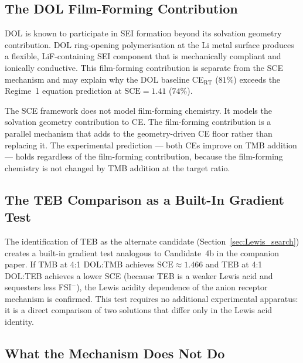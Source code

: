 \documentclass[11pt]{article}
\theoremstyle{plain}
\theoremstyle{definition}
\theoremstyle{remark}
\begin{document}
\subsection{The DOL Film-Forming Contribution}

DOL is known to participate in SEI formation beyond its solvation
geometry contribution.  DOL ring-opening polymerisation at the Li metal
surface produces a flexible, LiF-containing SEI component that is
mechanically compliant and ionically conductive.  This film-forming
contribution is separate from the SCE mechanism and may explain why
the DOL baseline CE$_\mathrm{RT}$ ($81\%$) exceeds the Regime~1
equation prediction at $\mathrm{SCE} = 1.41$ ($74\%$).

The SCE framework does not model film-forming chemistry.  It models
the solvation geometry contribution to CE.  The film-forming
contribution is a parallel mechanism that adds to the geometry-driven
CE floor rather than replacing it.  The experimental prediction --- both
CEs improve on TMB addition --- holds regardless of the film-forming
contribution, because the film-forming chemistry is not changed by
TMB addition at the target ratio.

\subsection{The TEB Comparison as a Built-In Gradient Test}

The identification of TEB as the alternate candidate (Section~\ref{sec:Lewis_search})
creates a built-in gradient test analogous to Candidate~4b in the
companion paper.  If TMB at 4:1 DOL:TMB achieves $\mathrm{SCE} \approx 1.466$
and TEB at 4:1 DOL:TEB achieves a lower SCE (because TEB is a weaker
Lewis acid and sequesters less FSI$^-$), the Lewis acidity dependence
of the anion receptor mechanism is confirmed.  This test requires no
additional experimental apparatus: it is a direct comparison of two
solutions that differ only in the Lewis acid identity.

\subsection{What the Mechanism Does Not Do}
\end{document}

